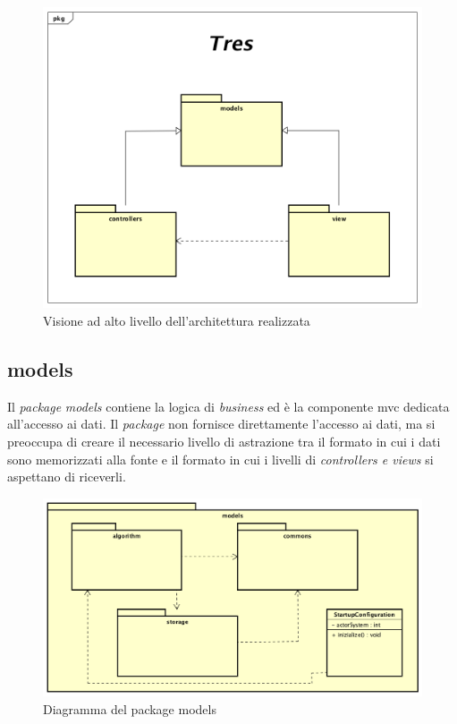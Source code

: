\begin{figure}[h]
\centering
\includegraphics[width=0.9\linewidth]{immagini/tres}
\caption[Visione ad alto livello dell'architettura realizzata]{Visione ad alto livello dell'architettura realizzata}
\label{fig:arcGenerale}
\end{figure}

\subsection*{models}
Il \textit{package} \textit{models} contiene la logica di \textit{business} ed è la componente \gls{mvc} dedicata all'accesso ai dati. Il \textit{package} non fornisce direttamente l'accesso ai dati, ma si preoccupa di creare il necessario livello di astrazione tra il formato in cui i dati sono memorizzati alla fonte e il formato in cui i livelli di \textit{controllers e views} si aspettano di riceverli.

\begin{figure}[h]
\centering
\includegraphics[width=0.9\linewidth]{immagini/tres-models}
\caption[Diagramma del package models]{Diagramma del package models}
\label{fig:tres-models}
\end{figure}

